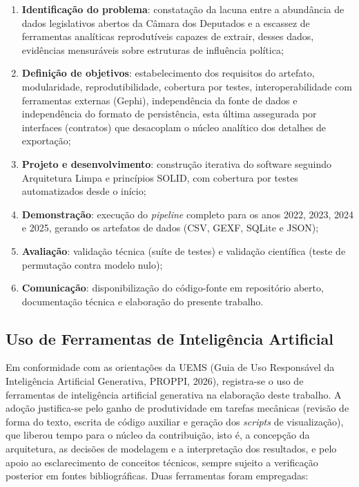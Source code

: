 \documentclass[
      12pt,
      a4paper,
      openright,
      oneside,
      chapter=TITLE,
      section=TITLE,
      english,
      french,
      spanish,
      brazilian
    ]{abntex2}
\begin{document}
    \begin{enumerate}[label=\alph*)]
        \item \textbf{Identificação do problema}: constatação da lacuna entre a abundância de dados legislativos abertos da Câmara dos Deputados e a escassez de ferramentas analíticas reprodutíveis capazes de extrair, desses dados, evidências mensuráveis sobre estruturas de influência política;
    
        \item \textbf{Definição de objetivos}: estabelecimento dos requisitos do artefato, modularidade, reprodutibilidade, cobertura por testes, interoperabilidade com ferramentas externas (Gephi), independência da fonte de dados e independência do formato de persistência, esta última assegurada por interfaces (contratos) que desacoplam o núcleo analítico dos detalhes de exportação;
    
        \item \textbf{Projeto e desenvolvimento}: construção iterativa do software seguindo Arquitetura Limpa \cite{martin2017} e princípios SOLID, com cobertura por testes automatizados desde o início;
    
        \item \textbf{Demonstração}: execução do \textit{pipeline} completo para os anos 2022, 2023, 2024 e 2025, gerando os artefatos de dados (CSV, GEXF, SQLite e JSON);
    
        \item \textbf{Avaliação}: validação técnica (suíte de testes) e validação científica (teste de permutação contra modelo nulo);
    
        \item \textbf{Comunicação}: disponibilização do código-fonte em repositório aberto, documentação técnica e elaboração do presente trabalho.
    \end{enumerate}
    
    \subsection{Uso de Ferramentas de Inteligência Artificial}
 
    Em conformidade com as orientações da UEMS (Guia de Uso Responsável da Inteligência
    Artificial Generativa, PROPPI, 2026), registra-se o uso de ferramentas de inteligência
    artificial generativa na elaboração deste trabalho. A adoção justifica-se pelo ganho
    de produtividade em tarefas mecânicas (revisão de forma do texto, escrita de código
    auxiliar e geração dos \textit{scripts} de visualização), que liberou tempo para o
    núcleo da contribuição, isto é, a concepção da arquitetura, as decisões de modelagem e
    a interpretação dos resultados, e pelo apoio ao esclarecimento de conceitos técnicos,
    sempre sujeito a verificação posterior em fontes bibliográficas. Duas ferramentas
    foram empregadas:
\end{document}
